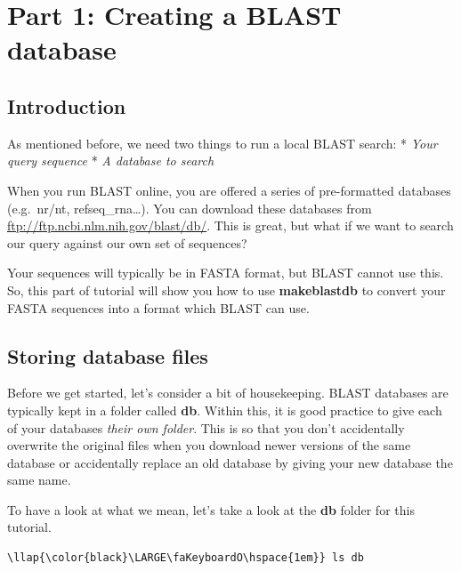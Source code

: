 \documentclass[11pt]{article}
\begin{document}
    \hypertarget{part-1-creating-a-blast-database}{%
\section{Part 1: Creating a BLAST
database}\label{part-1-creating-a-blast-database}}

    \hypertarget{introduction}{%
\subsection{Introduction}\label{introduction}}

As mentioned before, we need two things to run a local BLAST search: *
\textit{Your query sequence} * \textit{A database to search}

When you run BLAST online, you are offered a series of pre-formatted
databases (e.g.~nr/nt, refseq\_rna\ldots{}). You can download these
databases from \url{ftp://ftp.ncbi.nlm.nih.gov/blast/db/}. This is
great, but what if we want to search our query against our own set of
sequences?

Your sequences will typically be in FASTA format, but BLAST cannot use
this. So, this part of tutorial will show you how to use
\textbf{makeblastdb} to convert your FASTA sequences into a format which
BLAST can use.

    \hypertarget{storing-database-files}{%
\subsection{Storing database files}\label{storing-database-files}}

Before we get started, let's consider a bit of housekeeping. BLAST
databases are typically kept in a folder called \textbf{db}. Within
this, it is good practice to give each of your databases \textit{their own
folder}. This is so that you don't accidentally overwrite the original
files when you download newer versions of the same database or
accidentally replace an old database by giving your new database the
same name.

To have a look at what we mean, let's take a look at the \textbf{db}
folder for this tutorial.

\begin{terminalinput}
\begin{Verbatim}[commandchars=\\\{\}]
\llap{\color{black}\LARGE\faKeyboardO\hspace{1em}} ls db
\end{Verbatim}
\end{terminalinput}
\end{document}
